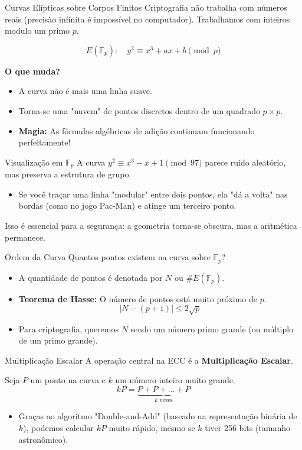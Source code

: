 \documentclass[aspectratio=169]{beamer}
\begin{document}
\begin{frame}{Curvas Elípticas sobre Corpos Finitos}
  Criptografia não trabalha com números reais (precisão infinita é impossível no computador). Trabalhamos com inteiros modulo um primo $p$.
  
  $$ E(\mathbb{F}_p): \quad y^2 \equiv x^3 + ax + b \pmod p $$
  
  \textbf{O que muda?}
  \begin{itemize}
      \item A curva não é mais uma linha suave.
      \item Torna-se uma "nuvem" de pontos discretos dentro de um quadrado $p \times p$.
      \item \textbf{Magia:} As fórmulas algébricas de adição continuam funcionando perfeitamente!
  \end{itemize}
\end{frame}

\begin{frame}{Visualização em $\mathbb{F}_p$}
  A curva $y^2 \equiv x^3 - x + 1 \pmod{97}$ parece ruído aleatório, mas preserva a estrutura de grupo.
  
  \begin{itemize}
      \item Se você traçar uma linha "modular" entre dois pontos, ela "dá a volta" nas bordas (como no jogo Pac-Man) e atinge um terceiro ponto.
  \end{itemize}
  Isso é essencial para a segurança: a geometria torna-se obscura, mas a aritmética permanece.
\end{frame}

\begin{frame}{Ordem da Curva}
  Quantos pontos existem na curva sobre $\mathbb{F}_p$?
  
  \begin{itemize}
      \item A quantidade de pontos é denotada por $N$ ou $\#E(\mathbb{F}_p)$.
      \item \textbf{Teorema de Hasse:} O número de pontos está muito próximo de $p$.
      $$ |N - (p+1)| \le 2\sqrt{p} $$
      \item Para criptografia, queremos $N$ sendo um número primo grande (ou múltiplo de um primo grande).
  \end{itemize}
\end{frame}

\begin{frame}{Multiplicação Escalar}
  A operação central na ECC é a \textbf{Multiplicação Escalar}.
  
  Seja $P$ um ponto na curva e $k$ um número inteiro muito grande.
  $$ kP = \underbrace{P + P + \dots + P}_{k \text{ vezes}} $$
  
  \begin{itemize}
      \item Graças ao algoritmo "Double-and-Add" (baseado na representação binária de $k$), podemos calcular $kP$ muito rápido, mesmo se $k$ tiver 256 bits (tamanho astronômico).
  \end{itemize}
\end{frame}
\end{document}
